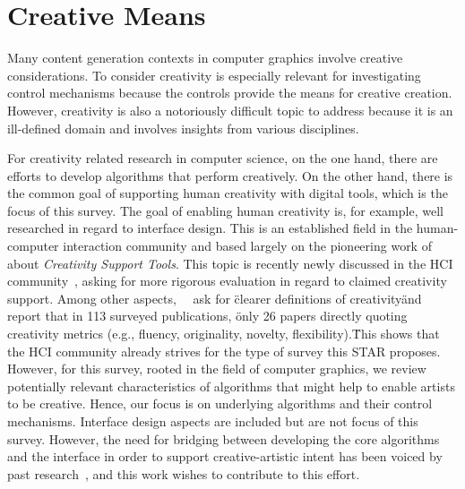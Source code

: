 

\section{Creative Means}
\label{sec:creativ_means}

Many content generation contexts in computer graphics involve creative considerations. To consider creativity is especially relevant for investigating control mechanisms because the controls provide the means for creative creation. However, creativity is also a notoriously difficult topic to address because it is an ill-defined domain and involves insights from various disciplines.


For creativity related research in computer science, on the one hand, there are efforts to develop algorithms that perform creatively. On the other hand, there is the common goal of supporting human creativity with digital tools, which is the focus of this survey. The goal of enabling human creativity is, for example, well researched in regard to interface design. This is an established field in the human-computer interaction community and based largely on the pioneering work of \citeauthor*{shneiderman_2007_cst}~\cite{shneiderman_2007_cst} about \textit{Creativity Support Tools}. This topic is recently newly discussed in the HCI community~\cite{frich_2018_tyo, frich_2019_mtl, remy_2020_ecs}, asking for more rigorous evaluation in regard to claimed creativity support. Among other aspects,~\citeauthor*{frich_2018_tyo}~\cite{frich_2018_tyo} ask for \"clearer definitions of creativity\" and~\citeauthor*{frich_2018_tyo}~\cite{frich_2018_tyo} report that in 113 surveyed publications, \"only 26 papers directly quoting creativity metrics (e.g., fluency, originality, novelty, flexibility).\" This shows that the HCI community already strives for the type of survey this STAR proposes. However, for this survey, rooted in the field of computer graphics, we review potentially relevant characteristics of algorithms that might help to enable artists to be creative. Hence, our focus is on underlying algorithms and their control mechanisms. Interface design aspects are included but are not focus of this survey. However, the need for bridging between developing the core algorithms and the interface in order to support creative-artistic intent has been voiced by past research~\cite{deterding_2017_mci,isenberg_2016_inw, salesin_2002_nar}, and this work wishes to contribute to this effort.

